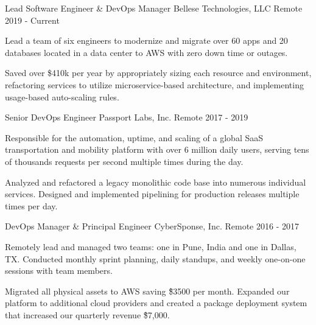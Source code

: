 

\begin{cventries}

  \cventry
    {Lead Software Engineer \& DevOps Manager} %
    {Bellese Technologies, LLC} %
    {Remote} %
    {2019 - Current} %
    {
 \begin{cvitems} %
        \item {Lead a team of six engineers to modernize and migrate over 60 apps and 20 databases located in a data center to AWS with zero down time or outages.} 
        \item {Saved over \$410k per year by appropriately sizing each resource and environment, refactoring services to utilize microservice-based architecture, and implementing usage-based auto-scaling rules.}
      \end{cvitems}
    }

  \cventry
    {Senior DevOps Engineer} %
    {Passport Labs, Inc.} %
    {Remote} %
    {2017 - 2019} %
    {
      \begin{cvitems} %
        \item {Responsible for the automation, uptime, and scaling of a  global SaaS transportation and mobility platform with over 6 million daily users, serving tens of thousands requests per second multiple times during the day.}
        \item {Analyzed and refactored a legacy monolithic code base into numerous individual services. Designed and implemented pipelining for production releases multiple times per day.}
      \end{cvitems}
    }

  \cventry
    {DevOps Manager \& Principal Engineer} %
    {CyberSponse, Inc.} %
    {Remote} %
    {2016 - 2017} %
    {
      \begin{cvitems} %
        \item {Remotely lead and managed two teams: one in Pune, India and one in Dallas, TX. Conducted monthly sprint planning, daily standups, and weekly one-on-one sessions with team members.}
        \item {Migrated all physical assets to AWS saving \~\$3500 per month. Expanded our platform to additional cloud providers and created a package deployment system that increased our quarterly revenue \~\$7,000.}
      \end{cvitems}
    }


\end{cventries}
